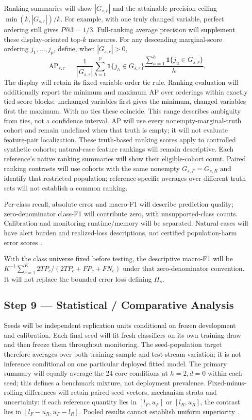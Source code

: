 \documentclass[11pt,a4paper]{article}
\newcommand{\ind}{\mathbf{1}}
\begin{document}
Ranking summaries will show $|G_{s,r}|$ and the attainable precision ceiling
$\min(k,|G_{s,r}|)/k$. For example, with one truly changed variable,
perfect ordering still gives $P@3=1/3$. Full-ranking average precision
will supplement these display-oriented top-$k$ measures. For any descending
marginal-score ordering $j_1,\ldots,j_p$, define, when $|G_{s,r}|>0$,
\begin{equation}
\operatorname{AP}_{s,r}=
\frac{1}{|G_{s,r}|}\sum_{h=1}^{p}
\ind\{j_h\in G_{s,r}\}
\frac{\sum_{u=1}^{h}\ind\{j_u\in G_{s,r}\}}{h}.
\end{equation}
The display will retain its fixed variable-order tie rule. Ranking evaluation
will additionally report the minimum and maximum AP over orderings within
exactly tied score blocks: unchanged variables first gives the minimum,
changed variables first the maximum. With no ties these coincide.
This range describes ambiguity from ties, not a confidence interval.
AP will use every nonempty-marginal-truth cohort and remain undefined when
that truth is empty; it will not evaluate feature-pair localization.
These truth-based ranking scores apply to controlled synthetic cohorts;
natural-case feature rankings will remain descriptive.
Each reference's native ranking summaries will show their eligible-cohort
count. Paired ranking contrasts will use cohorts with the same nonempty
$G_{s,F}=G_{s,R}$ and identify that restricted population; reference-specific
averages over different truth sets will not establish a common ranking.

Per-class recall, absolute
error and macro-F1 will describe prediction quality; zero-denominator class-F1
will contribute zero, with unsupported-class counts. Calibration and monitoring
runtime/memory will be separated. Natural cases will have alert burden and
realized-loss descriptions, not certified population-harm error scores
\cite{szucs,gretton,souza}.

With the class universe fixed before testing, the descriptive macro-F1 will be
$K^{-1}\sum_{c=1}^K 2TP_c/(2TP_c+FP_c+FN_c)$ under that zero-denominator
convention. It will not replace the bounded error loss defining $H_s$.

\subsection*{Step 9 --- Statistical / Comparative Analysis}
Seeds will be independent replication units conditional on frozen development
and calibration. Each final seed will fit fresh classifiers on its own
training draw and then freeze them throughout monitoring. The seed-population
target therefore averages over both training-sample and test-stream variation;
it is not inference conditional on one particular deployed fitted model.
The primary summary will equally average the 24 core
conditions at $h=2,d=0$ within each seed; this defines a benchmark mixture,
not deployment prevalence. Fixed-minus-rolling differences will retain paired
seed vectors, mechanism strata and uncertainty: if each reference quantity lies
in $[l_F,u_F]$ or $[l_R,u_R]$, the contrast lies in
$[l_F-u_R,u_F-l_R]$. Pooled results cannot establish uniform superiority
\cite{window,souza}.
\end{document}
